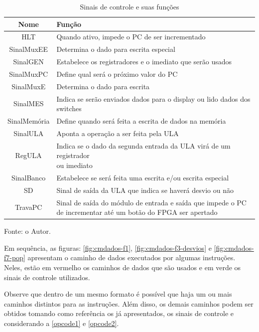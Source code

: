\documentclass[
	12pt,				%
	oneside,
	a4paper,			%
	english,			%
	french,				%
	spanish,			%
	brazil,				%
	]{abntex2}
\begin{document}
\setlength{\tabcolsep}{10pt} %
\begin{table}[H]
\centering
\caption{Sinais de controle e suas funções}
\label{tab:sinais_de_controle}
\begin{tabular}{|c|l|}
\hline
\textbf{Nome} & \textbf{Função} \\
\hline
HLT & Quando ativo, impede o PC de ser incrementado \\
\hline
SinalMuxEE & Determina o dado para escrita especial \\
\hline
SinalGEN & Estabelece os registradores e o imediato que serão usados \\
\hline
SinalMuxPC & Define qual será o próximo valor do PC \\
\hline
SinalMuxE & Determina o dado para escrita \\
\hline
SinalMES & \makecell[l]{Indica se serão enviados dados para o display ou lido dados dos \\ switches} \\
\hline
SinalMemória & Define quando será feita a escrita de dados na memória \\
\hline
SinalULA & Aponta a operação a ser feita pela ULA \\
\hline
RegULA &  \makecell[l]{Indica se o dado da segunda entrada da ULA virá de um registrador \\ ou imediato} \\
\hline
SinalBanco & Estabelece se será feita uma escrita e/ou escrita especial \\
\hline
SD & Sinal de saída da ULA que indica se haverá desvio ou não \\
\hline
TravaPC & \makecell[l]{Sinal de saída do módulo de entrada e saída que impede o PC \\ de incrementar até um botão do FPGA ser apertado} \\
\hline
\end{tabular}
\vspace{-0.5em}
\begin{center}
Fonte: o Autor.
\end{center}
\end{table}

Em sequência, as figuras: \autoref{fig:cmdados-f1}, \autoref{fig:cmdados-f3-desvios} e \autoref{fig:cmdados-f7-pop} apresentam o caminho de dados executados por algumas instruções. Neles, estão em vermelho os caminhos de dados que são usados e em verde os sinais de controle utilizados.

Observe que dentro de um mesmo formato é possível que haja um ou mais caminhos distintos para as instruções. Além disso, os demais caminhos podem ser obtidos tomando como referência os já apresentados, os sinais de controle e considerando a \autoref{opcode1} e \autoref{opcode2}.
\end{document}
